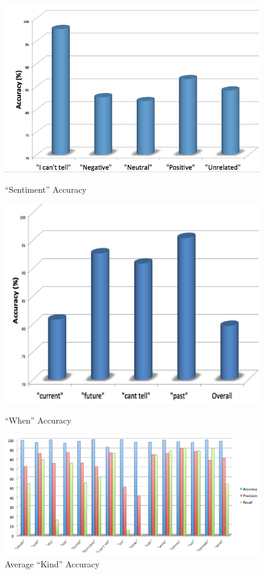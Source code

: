 \begin{figure}[H]
  \includegraphics[width=\linewidth]{results/svmSentiment}
  \caption{``Sentiment'' Accuracy}\label{fig:svmSentiment}
\endminipage\hfill
{}
  \includegraphics[width=\linewidth]{results/svmWhen}
  \caption{``When'' Accuracy}\label{fig:svmWhen}
\endminipage\hfill
{}%
  \includegraphics[width=\linewidth]{results/svmKind}
  \caption{Average ``Kind'' Accuracy}\label{fig:svmKind}
\endminipage
\end{figure}
 
